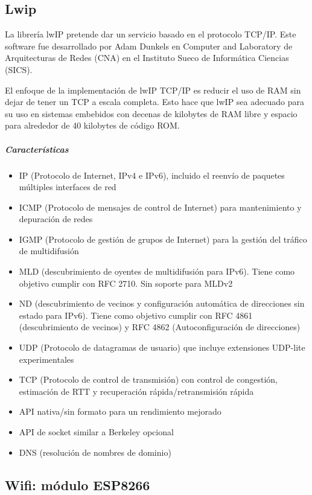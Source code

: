 


\subsection{Lwip}
La librería lwIP pretende dar un servicio basado en el protocolo TCP/IP. Este software fue desarrollado por Adam Dunkels en Computer and Laboratory de Arquitecturas de Redes (CNA) en el Instituto Sueco de Informática Ciencias (SICS).

El enfoque de la implementación de lwIP TCP/IP es reducir el uso de RAM sin dejar de tener un TCP a escala completa. Esto hace que lwIP sea adecuado para su uso en sistemas embebidos con decenas de kilobytes de RAM libre y espacio para alrededor de 40 kilobytes de código ROM.

\subparagraph{Características}
\begin{itemize}
  \item IP (Protocolo de Internet, IPv4 e IPv6), incluido el reenvío de paquetes
    múltiples interfaces de red
  \item ICMP (Protocolo de mensajes de control de Internet) para mantenimiento y depuración de redes
  \item IGMP (Protocolo de gestión de grupos de Internet) para la gestión del tráfico de multidifusión
  \item MLD (descubrimiento de oyentes de multidifusión para IPv6). Tiene como objetivo cumplir con
    RFC 2710. Sin soporte para MLDv2
  \item ND (descubrimiento de vecinos y configuración automática de direcciones sin estado para IPv6).
    Tiene como objetivo cumplir con RFC 4861 (descubrimiento de vecinos) y RFC 4862
    (Autoconfiguración de direcciones)
  \item UDP (Protocolo de datagramas de usuario) que incluye extensiones UDP-lite experimentales
  \item TCP (Protocolo de control de transmisión) con control de congestión, estimación de RTT
    y recuperación rápida/retransmisión rápida
  \item API nativa/sin formato para un rendimiento mejorado
  \item API de socket similar a Berkeley opcional
  \item DNS (resolución de nombres de dominio)
\end{itemize}

\subsection{Wifi: módulo ESP8266}

